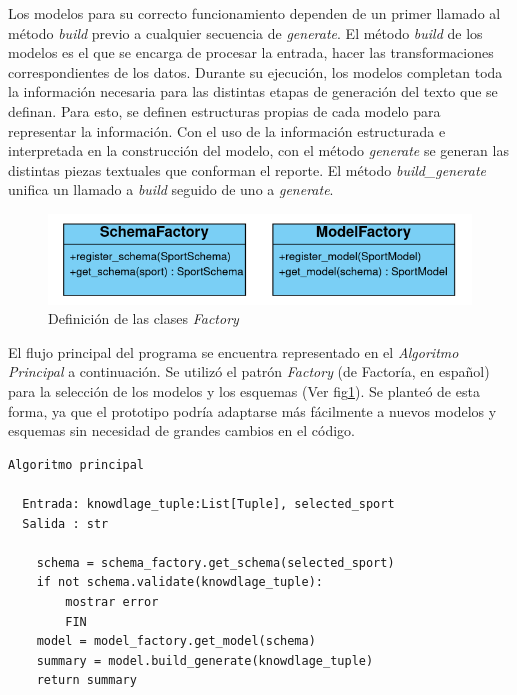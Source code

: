 Los modelos para su correcto funcionamiento dependen de un primer llamado al método \emph{build} previo a cualquier 
secuencia de \emph{generate}. El método \emph{build} de los modelos es el que se encarga de procesar la entrada, hacer las 
transformaciones correspondientes de los datos. Durante su ejecución, los modelos completan toda la información 
necesaria para las distintas etapas de generación del texto que se definan. Para esto, se definen estructuras propias de cada 
modelo para representar la información. Con el uso de la información estructurada e interpretada en la construcción del modelo, 
con el método \emph{generate} se generan las distintas piezas textuales que conforman el reporte. El m\'etodo \emph{build\_generate} 
unifica un llamado a \emph{build} seguido de uno a \emph{generate}.


\begin{figure}[!]
    \begin{center}
        \includegraphics[width=\textwidth]{Graphics/factories.png}
    \end{center}
    \caption{Definición de las clases \emph{Factory}}
    \label{fig_classFactory}
\end{figure}


El flujo principal del programa se encuentra representado en el \textit{Algoritmo Principal} a continuación. Se utilizó el patrón 
\emph{Factory} (de Factoría, en español) para la selección de los modelos y los esquemas (Ver fig\ref{fig_classFactory}). 
Se planteó de esta forma, ya que el prototipo podría adaptarse más fácilmente a nuevos modelos y esquemas sin necesidad de grandes 
cambios en el código. %

\pagebreak

\begin{verbatim}
Algoritmo principal

  Entrada: knowdlage_tuple:List[Tuple], selected_sport
  Salida : str

    schema = schema_factory.get_schema(selected_sport)
    if not schema.validate(knowdlage_tuple):
        mostrar error
        FIN
    model = model_factory.get_model(schema)
    summary = model.build_generate(knowdlage_tuple)
    return summary

\end{verbatim}



